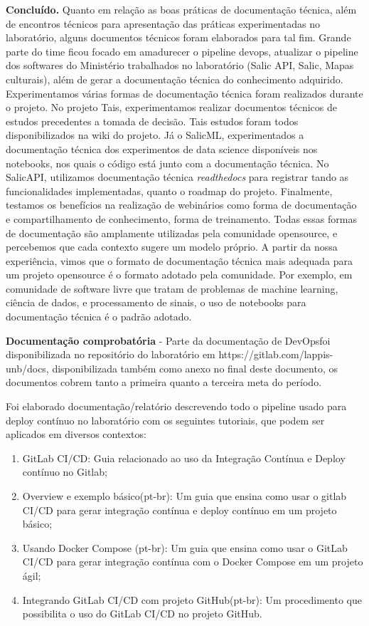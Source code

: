 \textbf{Concluído.} Quanto em relação as boas práticas de documentação
técnica, além de encontros técnicos para apresentação das práticas
experimentadas no laboratório, alguns documentos técnicos foram
elaborados para tal fim. Grande parte do time ficou focado em amadurecer
o pipeline devops, atualizar o pipeline dos softwares do Ministério
trabalhados no laboratório (Salic API, Salic, Mapas culturais), além de
gerar a documentação técnica do conhecimento adquirido. Experimentamos
várias formas de documentação técnica foram realizados durante o
projeto. No projeto Tais, experimentamos realizar documentos técnicos de
estudos precedentes a tomada de decisão. Tais estudos foram todos
disponibilizados na wiki do projeto. Já o SalicML, experimentados a
documentação técnica dos experimentos de data science disponíveis nos
notebooks, nos quais o código está junto com a documentação técnica. No
SalicAPI, utilizamos documentação técnica \emph{readthedocs} para
registrar tando as funcionalidades implementadas, quanto o roadmap do
projeto. Finalmente, testamos os benefícios na realização de webinários
como forma de documentação e compartilhamento de conhecimento, forma de
treinamento. Todas essas formas de documentação são amplamente
utilizadas pela comunidade opensource, e percebemos que cada contexto
sugere um modelo próprio. A partir da nossa experiência, vimos que o
formato de documentação técnica mais adequada para um projeto opensource
é o formato adotado pela comunidade. Por exemplo, em comunidade de
software livre que tratam de problemas de machine learning, ciência de
dados, e processamento de sinais, o uso de notebooks para documentação
técnica é o padrão adotado.

\textbf{Documentação comprobatória} - Parte da documentação de DevOpsfoi
disponibilizada no repositório do laboratório em
https://gitlab.com/lappis-unb/docs, disponibilizada também como anexo no
final deste documento, os documentos cobrem tanto a primeira quanto a
terceira meta do período.

Foi elaborado documentação/relatório descrevendo todo o pipeline usado
para deploy contínuo no laboratório com os seguintes tutoriais, que
podem ser aplicados em diversos contextos:

\begin{enumerate}
\def\labelenumi{\arabic{enumi}.}
\tightlist
\item
  GitLab CI/CD: Guia relacionado ao uso da Integração Contínua e Deploy
  contínuo no Gitlab;
\item
  Overview e exemplo básico(pt-br): Um guia que ensina como usar o
  gitlab CI/CD para gerar integração contínua e deploy contínuo em um
  projeto básico;
\item
  Usando Docker Compose (pt-br): Um guia que ensina como usar o GitLab
  CI/CD para gerar integração contínua com o Docker Compose em um
  projeto ágil;
\item
  Integrando GitLab CI/CD com projeto GitHub(pt-br): Um procedimento que
  possibilita o uso do GitLab CI/CD no projeto GitHub.
\end{enumerate}

